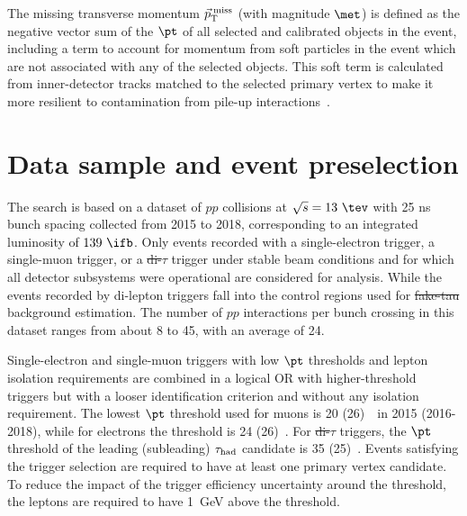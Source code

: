 \documentclass[PAPER, coverpage, atlasdraft=true, texlive=2016, UKenglish]{\ATLASLATEXPATH atlasdoc}
\providecommand{\DIFadd}[1]{{\protect\color{blue}\uwave{#1}}} %
\providecommand{\DIFdel}[1]{{\protect\color{red}\sout{#1}}}                      %
\providecommand{\DIFaddbegin}{} %
\providecommand{\DIFaddend}{} %
\providecommand{\DIFdelbegin}{} %
\providecommand{\DIFdelend}{} %
\begin{document}

The missing transverse momentum $\vec{p}_\textrm{T}^\textrm{\;miss}$ (with magnitude $\met$) is defined as the negative vector sum of the 
$\pt$ of all selected and calibrated objects in the event, including a term to account for momentum from soft particles 
in the event which are not associated with any of the selected objects. 
This soft term is calculated from inner-detector tracks matched to the selected primary vertex to make it more resilient to
contamination from pile-up interactions~\cite{Aaboud:2018tkc}.




\section{Data sample and event preselection}
\label{sec:data_presel}

The search is based on a dataset of $pp$ collisions at $\sqrt{s}=13~\tev$ with 25 ns bunch spacing collected from 2015 to 2018, corresponding to an integrated luminosity of $139~\ifb$.
Only events recorded with a single-electron trigger, a single-muon trigger, or a \DIFdelbegin \DIFdel{di-$\tau$ }\DIFdelend \DIFaddbegin \DIFadd{di-tau }\DIFaddend trigger under stable beam conditions 
and for which all detector subsystems were operational are considered for analysis. While the events recorded by di-lepton triggers fall into the control regions used for \DIFdelbegin \DIFdel{fake-tau }\DIFdelend \DIFaddbegin \DIFadd{fake tau }\DIFaddend background estimation.
The number of $pp$ interactions per bunch crossing in this dataset ranges from about 8 to 45, with an average of 24.

Single-electron and single-muon triggers with low $\pt$ thresholds and lepton isolation requirements are combined in a logical OR 
with higher-threshold triggers but with a looser identification criterion and without any isolation requirement.
The lowest $\pt$ threshold used for muons is 20 (26)~\gev\ in 2015 (2016-2018), while for electrons the threshold is 24 (26)~\gev.
For \DIFdelbegin \DIFdel{di-$\tau$ }\DIFdelend \DIFaddbegin \DIFadd{di-tau }\DIFaddend triggers, the $\pt$ threshold of the leading (subleading) \DIFdelbegin \DIFdel{$\tau_{\mathrm{had}}$ }\DIFdelend \DIFaddbegin \DIFadd{tau }\DIFaddend candidate is 35 (25)~\gev.
Events satisfying the trigger selection are required to have at least one primary vertex candidate.
To reduce the impact of the trigger efficiency uncertainty around the threshold, the leptons are required to have \DIFaddbegin \DIFadd{a }\DIFaddend \pt \DIFaddbegin \DIFadd{of }\DIFaddend 1~GeV above the threshold. 
\end{document}
